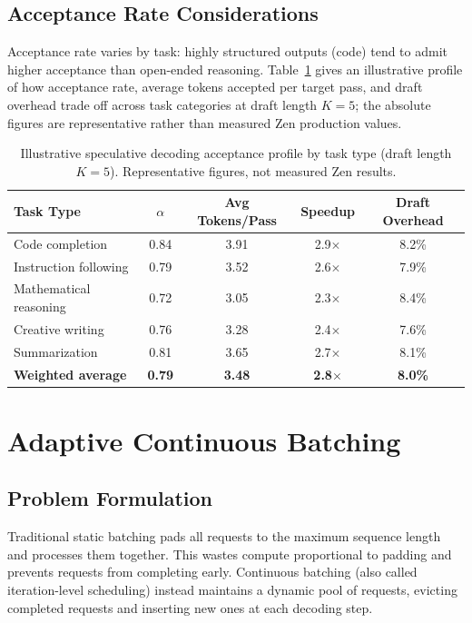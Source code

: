 \documentclass[11pt,a4paper]{article}
\begin{document}
\subsection{Acceptance Rate Considerations}

Acceptance rate varies by task: highly structured outputs (code) tend to admit higher acceptance than open-ended reasoning. Table~\ref{tab:speculative_acceptance} gives an illustrative profile of how acceptance rate, average tokens accepted per target pass, and draft overhead trade off across task categories at draft length $K=5$; the absolute figures are representative rather than measured Zen production values.

\begin{table}[H]
\centering
\caption{Illustrative speculative decoding acceptance profile by task type (draft length $K=5$). Representative figures, not measured Zen results.}
\label{tab:speculative_acceptance}
\begin{tabular}{lcccc}
\toprule
Task Type & $\alpha$ & Avg Tokens/Pass & Speedup & Draft Overhead \\
\midrule
Code completion & 0.84 & 3.91 & 2.9$\times$ & 8.2\% \\
Instruction following & 0.79 & 3.52 & 2.6$\times$ & 7.9\% \\
Mathematical reasoning & 0.72 & 3.05 & 2.3$\times$ & 8.4\% \\
Creative writing & 0.76 & 3.28 & 2.4$\times$ & 7.6\% \\
Summarization & 0.81 & 3.65 & 2.7$\times$ & 8.1\% \\
\textbf{Weighted average} & \textbf{0.79} & \textbf{3.48} & \textbf{2.8$\times$} & \textbf{8.0\%} \\
\bottomrule
\end{tabular}
\end{table}

\section{Adaptive Continuous Batching}

\subsection{Problem Formulation}

Traditional static batching pads all requests to the maximum sequence length and processes them together. This wastes compute proportional to padding and prevents requests from completing early. Continuous batching (also called iteration-level scheduling) instead maintains a dynamic pool of requests, evicting completed requests and inserting new ones at each decoding step.
\end{document}
